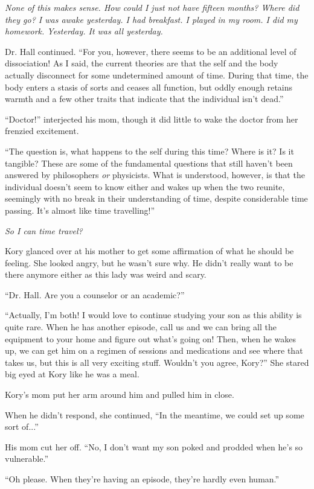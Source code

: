 \textit{None of this makes sense. How could I just not have fifteen months? Where did they go? I was awake yesterday. I had breakfast. I played in my room. I did my homework. Yesterday. It was all yesterday.}

Dr. Hall continued. ``For you, however, there seems to be an additional level of dissociation! As I said, the current theories are that the self and the body actually disconnect for some undetermined amount of time. During that time, the body enters a stasis of sorts and ceases all function, but oddly enough retains warmth and a few other traits that indicate that the individual isn't dead.''

``Doctor!'' interjected his mom, though it did little to wake the doctor from her frenzied excitement.

``The question is, what happens to the self during this time? Where is it? Is it tangible? These are some of the fundamental questions that still haven't been answered by philosophers \textit{or} physicists. What is understood, however, is that the individual doesn't seem to know either and wakes up when the two reunite, seemingly with no break in their understanding of time, despite considerable time passing. It's almost like time travelling!''

\textit{So I can time travel?}

Kory glanced over at his mother to get some affirmation of what he should be feeling. She looked angry, but he wasn't sure why. He didn't really want to be there anymore either as this lady was weird and scary.

``Dr. Hall. Are you a counselor or an academic?''

``Actually, I'm both! I would love to continue studying your son as this ability is quite rare. When he has another episode, call us and we can bring all the equipment to your home and figure out what's going on! Then, when he wakes up, we can get him on a regimen of sessions and medications and see where that takes us, but this is all very exciting stuff. Wouldn't you agree, Kory?'' She stared big eyed at Kory like he was a meal.

Kory's mom put her arm around him and pulled him in close.

When he didn't respond, she continued, ``In the meantime, we could set up some sort of...''

His mom cut her off. ``No, I don't want my son poked and prodded when he's so vulnerable.''

``Oh please. When they're having an episode, they're hardly even human.''

